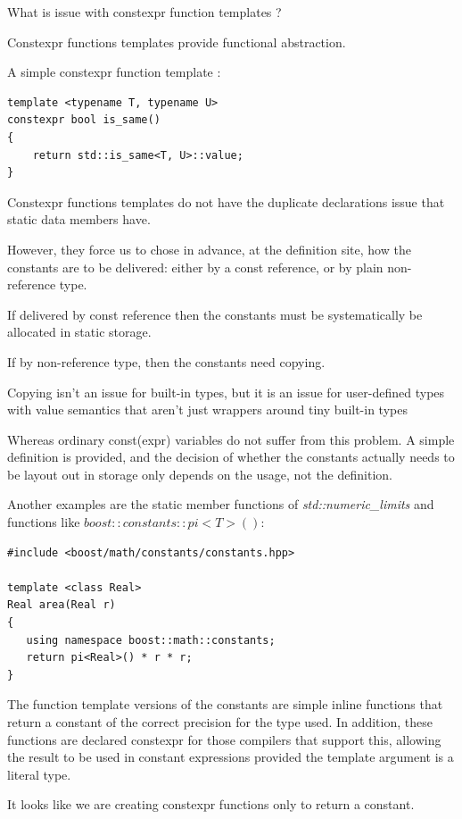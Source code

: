 \begin{Exercise}[title={constexpr function templates}, difficulty=3, label=ex03]
What is issue with constexpr function templates ?
\end{Exercise}


\begin{Answer}[ref=ex03]
Constexpr functions templates provide functional abstraction.

A simple constexpr function template :
\begin{lstlisting}
template <typename T, typename U>
constexpr bool is_same()
{
    return std::is_same<T, U>::value;
}
\end{lstlisting}
Constexpr functions templates  do not have the duplicate declarations issue that static data members have.

However, they force us to chose in advance, at the definition site, how the constants are to be delivered: either by a const reference, or by plain non-reference type. 

If delivered by const reference then the constants must be systematically be allocated in static storage.

If by non-reference type, then the constants need copying. 

Copying isn't an issue for built-in types, but it is an issue for user-defined types with value semantics that aren't just wrappers around tiny built-in types

Whereas ordinary const(expr) variables do not suffer from this problem. A simple definition is provided, and the decision of whether the constants actually needs to be layout out in
storage only depends on the usage, not the definition.

Another examples are the static member functions of \emph{std::numeric\_limits} and functions like $boost::constants::pi<T>()$:
\begin{lstlisting}
#include <boost/math/constants/constants.hpp>

template <class Real>
Real area(Real r)
{
   using namespace boost::math::constants;
   return pi<Real>() * r * r;
}
\end{lstlisting}
The function template versions of the constants are simple inline functions that return a constant of the correct precision for the type used. In addition, these functions are declared constexpr for those compilers that support this, allowing the result to be used in constant expressions provided the template argument is a literal type. 

It looks like we are creating constexpr functions only to return a constant.

\end{Answer}





